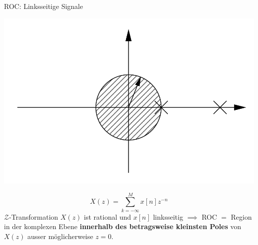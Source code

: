 \documentclass[14pt, aspectratio=169, handout]{beamer}
\begin{document}
\begin{frame}{ROC: Linksseitige Signale}
    \begin{minipage}[t]{0.45\textwidth}
        \vspace*{0.25cm}
        \includegraphics[width=\linewidth]{figures/Linksseitig.png}
    \end{minipage}
    \hfill
    \begin{minipage}[t]{0.45\textwidth}
        \vspace*{-0.75cm}
         $$X(z) = \sum_{k=-\infty}^M x[n]z^{-n}$$
         $\mathcal{Z}$-Transformation $X(z)$ ist rational und $x[n]$ linksseitig $\implies$ ROC $=$ Region in der komplexen Ebene \textbf{innerhalb des betragsweise kleinsten Poles} von $X(z)$ ausser möglicherweise $z=0$.
    \end{minipage}
\end{frame}
\end{document}
